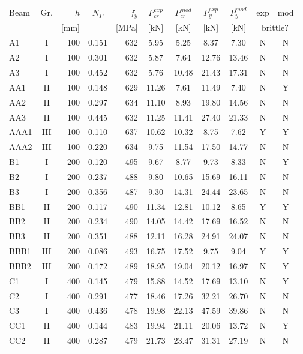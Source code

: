\begin{tabular}{l c r c r cc cc cc}
\toprule
Beam & Gr. & $h$ & $N_P$ & $f_y$ & $P_{cr}^{exp}$ & $P_{cr}^{mod}$ & $P_{y}^{exp}$ & $P_{y}^{mod}$ & exp & mod\\
 & & [mm] & & [MPa] & [kN] & [kN] & [kN] & [kN] & \multicolumn{2}{c}{brittle?}\\
\midrule
A1 & I & 100 & 0.151 & 632 & 5.95 & 5.25 & 8.37 & 7.30 & N & N\\
A2 & I & 100 & 0.301 & 632 & 5.87 & 7.64 & 12.76 & 13.46 & N & N\\
A3 & I & 100 & 0.452 & 632 & 5.76 & 10.48 & 21.43 & 17.31 & N & N\\
AA1 & II & 100 & 0.148 & 629 & 11.26 & 7.61 & 11.49 & 7.40 & N & Y\\
AA2 & II & 100 & 0.297 & 634 & 11.10 & 8.93 & 19.80 & 14.56 & N & N\\
AA3 & II & 100 & 0.445 & 632 & 11.25 & 11.41 & 27.40 & 21.33 & N & N\\
AAA1 & III & 100 & 0.110 & 637 & 10.62 & 10.32 & 8.75 & 7.62 & Y & Y\\
AAA2 & III & 100 & 0.220 & 634 & 9.75 & 11.54 & 17.50 & 14.77 & N & N\\
B1 & I & 200 & 0.120 & 495 & 9.67 & 8.77 & 9.73 & 8.33 & N & Y\\
B2 & I & 200 & 0.237 & 488 & 9.80 & 10.65 & 15.69 & 16.11 & N & N\\
B3 & I & 200 & 0.356 & 487 & 9.30 & 14.31 & 24.44 & 23.65 & N & N\\
BB1 & II & 200 & 0.117 & 490 & 11.34 & 12.81 & 10.12 & 8.65 & Y & Y\\
BB2 & II & 200 & 0.234 & 490 & 14.05 & 14.42 & 17.69 & 16.52 & N & N\\
BB3 & II & 200 & 0.351 & 488 & 12.11 & 16.28 & 24.91 & 24.07 & N & N\\
BBB1 & III & 200 & 0.086 & 493 & 16.75 & 17.52 & 9.75 & 9.04 & Y & Y\\
BBB2 & III & 200 & 0.172 & 489 & 18.95 & 19.04 & 20.12 & 16.97 & N & Y\\
C1 & I & 400 & 0.145 & 479 & 15.88 & 14.52 & 17.69 & 13.10 & N & Y\\
C2 & I & 400 & 0.291 & 477 & 18.46 & 17.26 & 32.21 & 26.70 & N & N\\
C3 & I & 400 & 0.436 & 478 & 19.98 & 22.13 & 47.59 & 39.86 & N & N\\
CC1 & II & 400 & 0.144 & 483 & 19.94 & 21.11 & 20.06 & 13.72 & N & Y\\
CC2 & II & 400 & 0.287 & 479 & 21.73 & 23.47 & 31.31 & 27.19 & N & N\\

\end{tabular}
